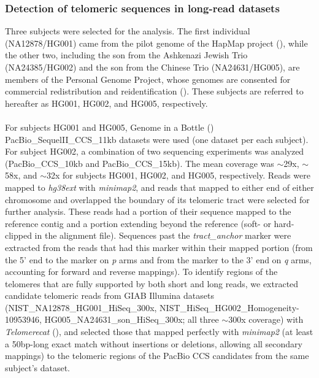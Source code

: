 \documentclass{article}
\newcommand{\citep}[1]{(\cite{#1})}
\begin{document}
\subsubsection*{Detection of telomeric sequences in long-read datasets}
Three subjects were selected for the analysis.
The first individual (NA12878/HG001) came from the pilot genome of the HapMap project \citep{HG001}, while the other two, including the son from the Ashkenazi Jewish Trio (NA24385/HG002) and the son from the Chinese Trio (NA24631/HG005), are members of the Personal Genome Project, whose genomes are consented for commercial redistribution and reidentification \citep{HG00X}.
These subjects are referred to hereafter as HG001, HG002, and HG005, respectively.
\\~\\
For subjects HG001 and HG005, Genome in a Bottle \citep{giab} PacBio\_SequelII\_CCS\_11kb datasets were used (one dataset per each subject).
For subject HG002, a combination of two sequencing experiments was analyzed (PacBio\_CCS\_10kb and PacBio\_CCS\_15kb).
The mean coverage was $\sim$29x, $\sim$58x, and $\sim$32x for subjects HG001, HG002, and HG005, respectively.
Reads were mapped to \textit{hg38ext} with \textit{minimap2}, and reads that mapped to either end of either chromosome and overlapped the boundary of its telomeric tract were selected for further analysis.
These reads had a portion of their sequence mapped to the reference contig and a portion extending beyond the reference (soft- or hard-clipped in the alignment file).
Sequences past the \textit{tract\_anchor} marker were extracted from the reads that had this marker within their mapped portion (from the 5' end to the marker on \textit{p} arms and from the marker to the 3' end on \textit{q} arms, accounting for forward and reverse mappings).
To identify regions of the telomeres that are fully supported by both short and long reads, we extracted candidate telomeric reads from GIAB Illumina datasets
   (NIST\_NA12878\_HG001\_HiSeq\_300x,
    NIST\_HiSeq\_HG002\_Homogeneity-10953946,
    HG005\_NA24631\_son\_HiSeq\_300x;
    all three $\sim$300x coverage)
with \textit{Telomerecat} \citep{telomerecat}, and selected those that mapped perfectly with \textit{minimap2} (at least a 50bp-long exact match without insertions or deletions, allowing all secondary mappings) to the telomeric regions of the PacBio CCS candidates from the same subject's dataset.
\end{document}
